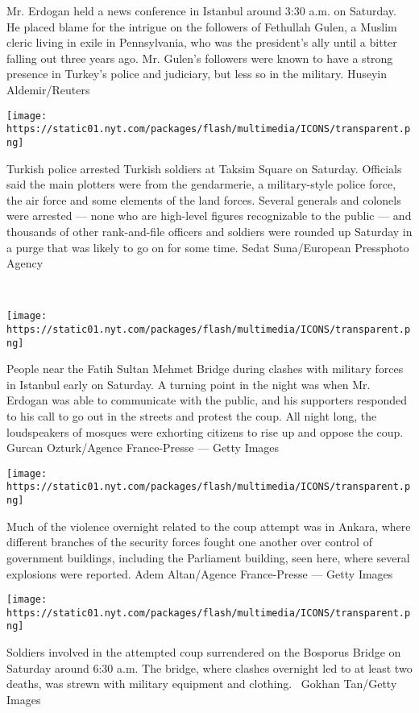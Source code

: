 Mr. Erdogan held a news conference in Istanbul around 3:30 a.m. on
Saturday. He placed blame for the intrigue on the followers of Fethullah
Gulen, a Muslim cleric living in exile in Pennsylvania, who was the
president's ally until a bitter falling out three years ago. Mr. Gulen's
followers were known to have a strong presence in Turkey's police and
judiciary, but less so in the military. Huseyin Aldemir/Reuters

\texttt{[image: https://static01.nyt.com/packages/flash/multimedia/ICONS/transparent.png]}

Turkish police arrested Turkish soldiers at Taksim Square on Saturday.
Officials said the main plotters were from the gendarmerie, a
military-style police force, the air force and some elements of the land
forces. Several generals and colonels were arrested --- none who are
high-level figures recognizable to the public --- and thousands of other
rank-and-file officers and soldiers were rounded up Saturday in a purge
that was likely to go on for some time. Sedat Suna/European Pressphoto
Agency

~

\texttt{[image: https://static01.nyt.com/packages/flash/multimedia/ICONS/transparent.png]}

People near the Fatih Sultan Mehmet Bridge during clashes with military
forces in Istanbul early on Saturday. A turning point in the night was
when Mr. Erdogan was able to communicate with the public, and his
supporters responded to his call to go out in the streets and protest
the coup. All night long, the loudspeakers of mosques were exhorting
citizens to rise up and oppose the coup. Gurcan Ozturk/Agence
France-Presse --- Getty Images

\texttt{[image: https://static01.nyt.com/packages/flash/multimedia/ICONS/transparent.png]}

Much of the violence overnight related to the coup attempt was in
Ankara, where different branches of the security forces fought one
another over control of government buildings, including the Parliament
building, seen here, where several explosions were reported. Adem
Altan/Agence France-Presse --- Getty Images

\texttt{[image: https://static01.nyt.com/packages/flash/multimedia/ICONS/transparent.png]}

Soldiers involved in the attempted coup surrendered on the Bosporus
Bridge on Saturday around 6:30 a.m. The bridge, where clashes overnight
led to at least two deaths, was strewn with military equipment and
clothing.~ Gokhan Tan/Getty Images

